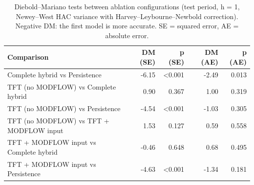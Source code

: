 \begin{table}[htbp]
\centering
\caption{Diebold--Mariano tests between ablation configurations (test period, h = 1, Newey--West HAC variance with Harvey--Leybourne--Newbold correction). Negative DM: the first model is more accurate. SE = squared error, AE = absolute error.}
\label{tab:ablation_dm_test}
\begin{tabular}{lrrrr}
\hline
Comparison & DM (SE) & p (SE) & DM (AE) & p (AE) \\
\hline
Complete hybrid vs Persistence & -6.15 & <0.001 & -2.49 & 0.013 \\
TFT (no MODFLOW) vs Complete hybrid & 0.90 & 0.367 & 1.00 & 0.319 \\
TFT (no MODFLOW) vs Persistence & -4.54 & <0.001 & -1.03 & 0.305 \\
TFT (no MODFLOW) vs TFT + MODFLOW input & 1.53 & 0.127 & 0.59 & 0.558 \\
TFT + MODFLOW input vs Complete hybrid & -0.46 & 0.648 & 0.68 & 0.495 \\
TFT + MODFLOW input vs Persistence & -4.63 & <0.001 & -1.34 & 0.181 \\
\hline
\end{tabular}
\end{table}